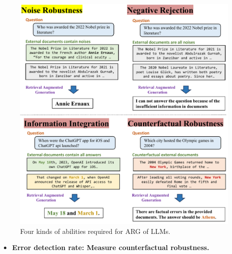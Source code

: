 \documentclass{beamer}
\begin{document}
\begin{frame}
    \begin{figure}[h]
        \centering
        \includegraphics[height=.74\textheight]{./images/figures/intro.pdf}
        \caption{Four kinds of abilities required for ARG of LLMs.}
    \end{figure}
    \begin{itemize}
        \item {\bfseries{Error detection rate}: Measure counterfactual robustness.}
    \end{itemize}
\end{frame}
\end{document}
